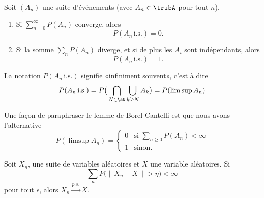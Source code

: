 \begin{lemma}
    Soit \( (A_n)\) une suite d'événements (avec \( A_n\in\tribA\) pour tout \( n\)).
    \begin{enumerate}
        \item
            Si \( \sum_{n=0}^{\infty}P(A_n)\) converge, alors
            \begin{equation}
                P(A_n\,\text{i.s.})=0.
            \end{equation}
        \item
            Si la somme \( \sum_nP(A_n)\) diverge, et si de plus les \( A_i\) sont indépendants, alors
            \begin{equation}
                P(A_n\,\text{i.s.})=1.
            \end{equation}
    \end{enumerate}
\end{lemma}
La notation \( P(A_n\,\text{i.s.})\) signifie «infiniment souvent», c'est à dire
\begin{equation}
    P(A_n\,\text{i.s.})=P\big( \bigcap_{N\in\eN}\bigcup_{k\geq N}A_k \big)=P(\limsup A_n)
\end{equation}

Une façon de paraphraser le lemme de Borel-Cantelli est que nous avons l'alternative
\begin{equation}    \label{EqparaphrCantelli}
    P(\limsup A_n)=\begin{cases}
        0    &   \text{si $\sum_{n\geq 0}P(A_n)<\infty$}\\
        1    &    \text{sinon}.
    \end{cases}
\end{equation}

\begin{proposition}
    Soit \( X_n\), une suite de variables aléatoires et \( X\) une variable aléatoires. Si
    \begin{equation}
        \sum_nP\big( \| X_n-X \|>\eta \big)<\infty
    \end{equation}
    pour tout \( \epsilon\), alors \( X_n\stackrel{p.s.}{\longrightarrow}X\).
\end{proposition}

